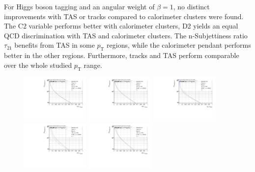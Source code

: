 For Higgs boson tagging and an angular weight of $\beta=1$, no distinct improvements with TAS or tracks compared to calorimeter clusters were found. The C2 variable performs better with calorimeter clusters, D2 yields an equal QCD discrimination with TAS and calorimeter clusters. The n-Subjettiness ratio $\tau_{21}$ benefits from TAS in some $p_{\mathrm{T}}$ regions, while the calorimeter pendant performs better in the other regions. Furthermore, tracks and TAS perform comparable over the whole studied $p_{\mathrm{T}}$ range. 
\begin{figure}[htp]
\includegraphics[width=0.3\textwidth]{sascha_input/plots/Higgs/ROC/Beta1/ROC_ALL_h_recoJet_C2_bin2.pdf} 
\includegraphics[width=0.3\textwidth]{sascha_input/plots/Higgs/ROC/Beta1/ROC_ALL_h_recoJet_D2_bin2.pdf} 
\includegraphics[width=0.3\textwidth]{sascha_input/plots/Higgs/ROC/Beta1/ROC_ALL_h_recoJet_nSub21_bin2.pdf}
\bigskip
\includegraphics[width=0.3\textwidth]{sascha_input/plots/Higgs/ROC/Beta1/ROC_ALL_h_recoJet_C2_bin5.pdf} \hspace{6mm}
\includegraphics[width=0.3\textwidth]{sascha_input/plots/Higgs/ROC/Beta1/ROC_ALL_h_recoJet_D2_bin5.pdf} \hspace{6mm}

\end{figure}
